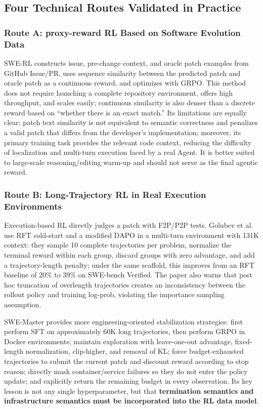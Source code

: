 \documentclass[10pt,a4paper,UTF8,fontset=none]{ctexart}
\begin{document}
\subsection{Four Technical Routes Validated in Practice}

\subsubsection{Route A: proxy-reward RL Based on Software Evolution Data}

SWE-RL constructs issue, pre-change context, and oracle patch examples from GitHub Issue/PR, uses sequence similarity between the predicted patch and oracle patch as a continuous reward, and optimizes with GRPO\cite{en:wei2025swerl}. This method does not require launching a complete repository environment, offers high throughput, and scales easily; continuous similarity is also denser than a discrete reward based on ``whether there is an exact match.'' Its limitations are equally clear: patch text similarity is not equivalent to semantic correctness and penalizes a valid patch that differs from the developer's implementation; moreover, its primary training task provides the relevant code context, reducing the difficulty of localization and multi-turn execution faced by a real Agent. It is better suited to large-scale reasoning/editing warm-up and should not serve as the final agentic reward.

\subsubsection{Route B: Long-Trajectory RL in Real Execution Environments}

Execution-based RL directly judges a patch with F2P/P2P tests. Golubev et al. use RFT cold-start and a modified DAPO in a multi-turn environment with 131K context: they sample 10 complete trajectories per problem, normalize the terminal reward within each group, discard groups with zero advantage, and add a trajectory-length penalty; under the same scaffold, this improves from an RFT baseline of 20\% to 39\% on SWE-bench Verified\cite{en:golubev2025longcontextrl}. The paper also warns that post hoc truncation of overlength trajectories creates an inconsistency between the rollout policy and training log-prob, violating the importance sampling assumption.

SWE-Master provides more engineering-oriented stabilization strategies\cite{en:song2026swemaster}: first perform SFT on approximately 60K long trajectories, then perform GRPO in Docker environments; maintain exploration with leave-one-out advantage, fixed-length normalization, clip-higher, and removal of KL; force budget-exhausted trajectories to submit the current patch and discount reward according to stop reason; directly mask container/service failures so they do not enter the policy update; and explicitly return the remaining budget in every observation. Its key lesson is not any single hyperparameter, but that \textbf{termination semantics and infrastructure semantics must be incorporated into the RL data model}.
\end{document}
